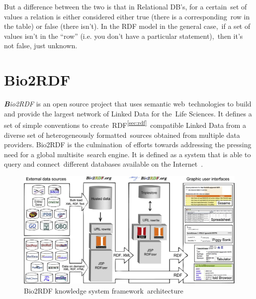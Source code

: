 \documentclass[DIV=calc, paper=a4, fontsize=12pt, onecolumn]{scrartcl}	 %
\newcommand{\initial}[1]{ %
\lettrine[lines=3,lhang=0.3,nindent=0em,slope=0em]{
\color{DarkBlue}
{\textbf{\textit{#1}}}}{}}
\begin{document}
  \noindent But a difference between the two is that in Relational DB's, for a certain\
  set of values a relation is either considered either true (there is a corresponding\
  row in the table) or false (there isn't). In the RDF model in the general case,\
  if a set of values isn't in the ``row'' (i.e. you don't have a particular statement),\
  then it's not false, just unknown. \citep{_rdf_comparison_2013}\

  \section{Bio2RDF}
  \label{sec:bio2rdf}
  
  \initial{B}\textit{io2RDF} is an open source project that uses semantic web\
  technologies to build and provide the largest network of Linked Data for the\
  Life Sciences. It defines a set of simple conventions to create\
  RDF\textsuperscript{\ref{sec:rdf}}\
  compatible Linked Data from a diverse set of heterogeneously formatted\
  sources obtained from multiple data providers. Bio2RDF is the culmination\
  of efforts towards addressing the pressing need for a global multisite\
  search engine. It is defined as a system that is able to query and connect\
  different databases available on the Internet~\citep{belleau_bio2rdf:_2008}.\\
    
  \begin{figure}[ht!]
    \centering
    \includegraphics[scale=0.30]{bio2rdf_architecture.jpg}
    \caption{Bio2RDF knowledge system framework\
    architecture~\citep[Fig.~1]{belleau_bio2rdf:_2008}}
    \label{fig:bio2rdf_architecture}
  \end{figure}  
\end{document}
